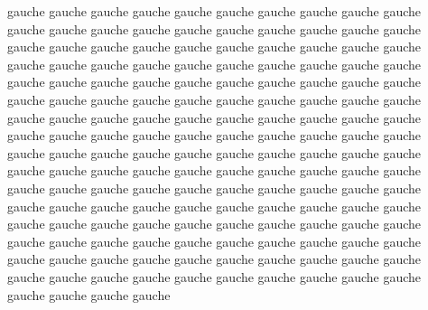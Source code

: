 \documentclass[12pt]{book}
\begin{document}
\begin{pages}
\begin{Leftside}
\beginnumbering
{}
gauche gauche gauche gauche gauche gauche gauche gauche gauche gauche gauche gauche gauche gauche gauche gauche gauche gauche gauche gauche gauche gauche gauche gauche gauche gauche gauche gauche gauche gauche gauche gauche gauche gauche gauche gauche gauche gauche gauche gauche gauche gauche gauche gauche gauche gauche gauche gauche gauche gauche gauche gauche gauche gauche gauche gauche gauche gauche gauche gauche gauche gauche gauche gauche gauche gauche gauche gauche gauche gauche gauche gauche gauche gauche gauche gauche gauche gauche gauche  gauche gauche gauche
\pend
{}
gauche gauche gauche gauche gauche gauche gauche gauche gauche gauche gauche gauche gauche gauche gauche gauche gauche gauche gauche gauche gauche gauche gauche gauche gauche gauche gauche gauche gauche gauche gauche gauche gauche gauche gauche gauche gauche gauche gauche gauche gauche gauche gauche gauche gauche gauche gauche gauche gauche gauche gauche gauche gauche gauche gauche gauche gauche gauche gauche gauche gauche gauche gauche gauche gauche gauche gauche gauche gauche gauche gauche gauche gauche gauche gauche gauche gauche gauche gauche  gauche gauche gauche
\pend
\endnumbering
\end{Leftside}


\end{pages}
\end{document}

